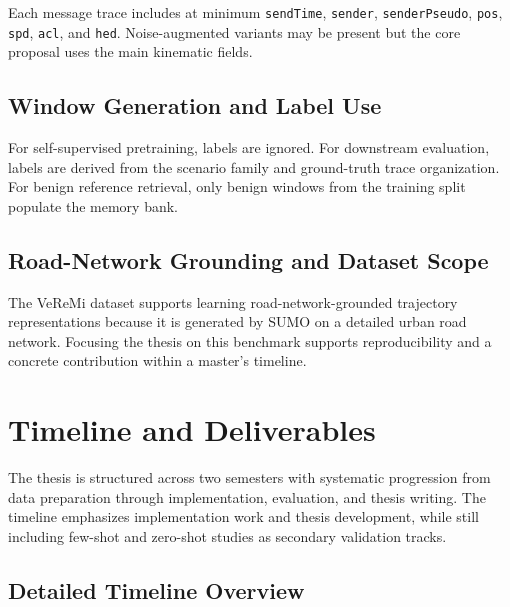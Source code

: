 \documentclass[12pt]{article}
\begin{document}
Each message trace includes at minimum \texttt{sendTime}, \texttt{sender}, \texttt{senderPseudo}, \texttt{pos}, \texttt{spd}, \texttt{acl}, and \texttt{hed}. Noise-augmented variants may be present but the core proposal uses the main kinematic fields.

\subsection{Window Generation and Label Use}

For self-supervised pretraining, labels are ignored. For downstream evaluation, labels are derived from the scenario family and ground-truth trace organization. For benign reference retrieval, only benign windows from the training split populate the memory bank.

\subsection{Road-Network Grounding and Dataset Scope}

The VeReMi dataset supports learning road-network-grounded trajectory representations because it is generated by SUMO on a detailed urban road network. Focusing the thesis on this benchmark supports reproducibility and a concrete contribution within a master's timeline.

\endgroup
\FloatBarrier

\section{Timeline and Deliverables}

The thesis is structured across two semesters with systematic progression from data preparation through implementation, evaluation, and thesis writing. The timeline emphasizes implementation work and thesis development, while still including few-shot and zero-shot studies as secondary validation tracks.

\subsection{Detailed Timeline Overview}
\end{document}
